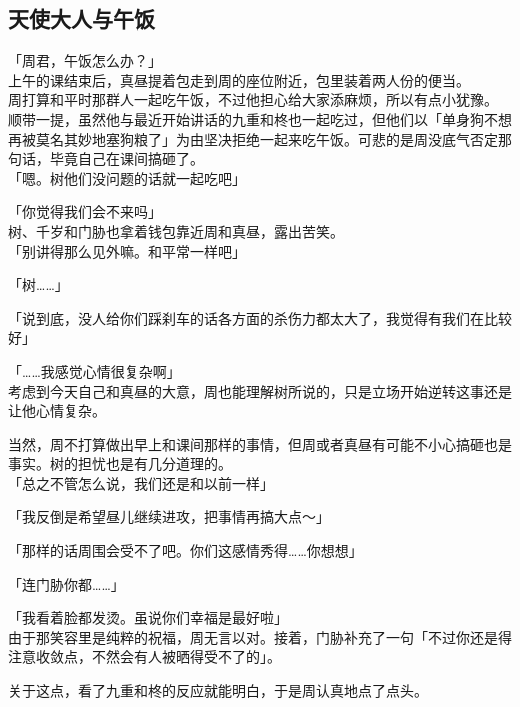 \subsection{天使大人与午饭}

「周君，午饭怎么办？」\\

上午的课结束后，真昼提着包走到周的座位附近，包里装着两人份的便当。\\

周打算和平时那群人一起吃午饭，不过他担心给大家添麻烦，所以有点小犹豫。\\

顺带一提，虽然他与最近开始讲话的九重和柊也一起吃过，但他们以「单身狗不想再被莫名其妙地塞狗粮了」为由坚决拒绝一起来吃午饭。可悲的是周没底气否定那句话，毕竟自己在课间搞砸了。\\

「嗯。树他们没问题的话就一起吃吧」

「你觉得我们会不来吗」\\

树、千岁和门胁也拿着钱包靠近周和真昼，露出苦笑。\\

「别讲得那么见外嘛。和平常一样吧」

「树……」

「说到底，没人给你们踩刹车的话各方面的杀伤力都太大了，我觉得有我们在比较好」

「……我感觉心情很复杂啊」\\

考虑到今天自己和真昼的大意，周也能理解树所说的，只是立场开始逆转这事还是让他心情复杂。

当然，周不打算做出早上和课间那样的事情，但周或者真昼有可能不小心搞砸也是事实。树的担忧也是有几分道理的。\\

「总之不管怎么说，我们还是和以前一样」

「我反倒是希望昼儿继续进攻，把事情再搞大点～」

「那样的话周围会受不了吧。你们这感情秀得……你想想」

「连门胁你都……」

「我看着脸都发烫。虽说你们幸福是最好啦」\\

由于那笑容里是纯粹的祝福，周无言以对。接着，门胁补充了一句「不过你还是得注意收敛点，不然会有人被晒得受不了的」。

关于这点，看了九重和柊的反应就能明白，于是周认真地点了点头。\\


